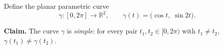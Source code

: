 \begin{problem}
Define the planar parametric curve
\[
  \gamma : [0, 2\pi] \to \mathbb{R}^{2},
  \qquad
  \gamma(t) = \bigl(\cos t,\; \sin 2t\bigr).
\]

\textbf{Claim.} The curve $\gamma$ is \emph{simple}: for every pair
$t_1, t_2 \in [0, 2\pi)$ with $t_1 \neq t_2$, $\gamma(t_1) \neq
\gamma(t_2)$.
\end{problem}
